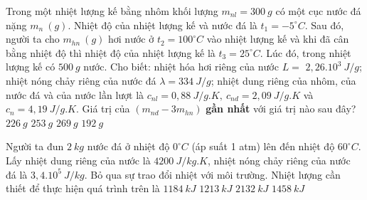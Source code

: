 \begin{ex}
	Trong một nhiệt lượng kế bằng nhôm khối lượng $m_{nl}=300\ g$ có một cục nước đá nặng $m_{n}\ (g)$. Nhiệt độ của nhiệt lượng kế và nước đá là $t_1=-5^\circ C$. Sau đó, người ta cho $m_{hn}\ (g)$ hơi nước ở $t_2=100^\circ C$ vào nhiệt lượng kế và khi đã cân bằng nhiệt độ thì nhiệt độ của nhiệt lượng kế là $t_3=25^\circ C$. Lúc đó, trong nhiệt lượng kế có $500\ g$ nước. Cho biết: nhiệt hóa hơi riêng của nước $L=$ $2,26.10^3\ J /g$; nhiệt nóng chảy riêng của nước đá $\lambda=334\ J /g$; nhiệt dung riêng của nhôm, của nước đá và của nước lần lượt là $c_{n l}=0,88\ J / g.K,\ c_{n d}=2,09\ J / g.K$ và $c_{n}=4,19\ J / g.K$. Giá trị của $\left(m_{nd}-3m_{hn}\right)$ \textbf{gần nhất} với giá trị nào sau đây?
	\choice
	{$226\ g$}
	{$253\ g$}
	{$269\ g$}
	{\True $192\ g$}
	\end{ex}
\begin{ex} 
	Người ta đun $2 \ kg$ nước đá ở nhiệt độ $0^\circ C$ (áp suất 1 atm) lên đến nhiệt độ $60^\circ C$. Lấy nhiệt dung riêng của nước là $4200 \ J/kg. K$, nhiệt nóng chảy riêng của nước đá là $3,4.10^{5} \ J/kg$. Bỏ qua sự trao đổi nhiệt với môi trường. Nhiệt lượng cần thiết để thực hiện quá trình trên là
	\choice
	{\True $1184 \ kJ$}
	{$1213 \ kJ$}
	{$2132 \ kJ$}
	{$1458 \ kJ$}
\end{ex}
